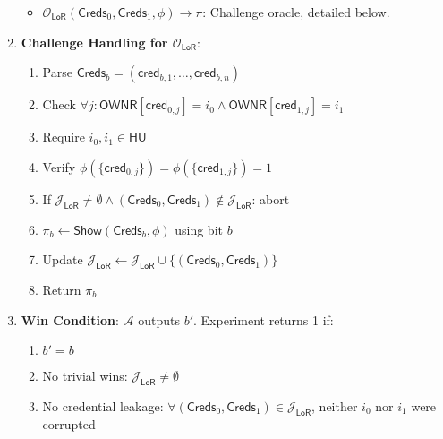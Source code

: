 \begin{enumerate}
\begin{itemize}
        \item $\mathcal{O}_{\mathsf{LoR}}(\mathsf{Creds}_0, \mathsf{Creds}_1, \phi) \rightarrow \pi$: Challenge oracle, detailed below.
    \end{itemize}
    \item \textbf{Challenge Handling for $\mathcal{O}_{\mathsf{LoR}}$}:
    \begin{enumerate}
        \item Parse $\mathsf{Creds}_b = (\mathsf{cred}_{b,1},\ldots,\mathsf{cred}_{b,n})$ 
        \item Check $\forall j: \mathsf{OWNR}[\mathsf{cred}_{0,j}] = i_0 \land \mathsf{OWNR}[\mathsf{cred}_{1,j}] = i_1$ 
        \item Require $i_0,i_1 \in \mathsf{HU}$
        \item Verify $\phi(\{\mathsf{cred}_{0,j}\}) = \phi(\{\mathsf{cred}_{1,j}\}) = 1$ 
        \item If $\mathcal{J}_{\mathsf{LoR}} \neq \emptyset \land (\mathsf{Creds}_0, \mathsf{Creds}_1) \notin \mathcal{J}_{\mathsf{LoR}}$: abort 
        \item $\pi_b \gets \mathsf{Show}(\mathsf{Creds}_b, \phi)$ using bit $b$
        \item Update $\mathcal{J}_{\mathsf{LoR}} \gets \mathcal{J}_{\mathsf{LoR}} \cup \{(\mathsf{Creds}_0,\mathsf{Creds}_1)\}$
        \item Return $\pi_b$
    \end{enumerate}

    \item \textbf{Win Condition}: $\mathcal{A}$ outputs $b'$.
    Experiment returns 1 if:
    \begin{enumerate}
        \item $b' = b$ 
        \item No trivial wins: $\mathcal{J}_{\mathsf{LoR}} \neq \emptyset$ 
        \item No credential leakage: $\forall (\mathsf{Creds}_0,\mathsf{Creds}_1) \in \mathcal{J}_{\mathsf{LoR}}$, neither $i_0$ nor $i_1$ were corrupted
       \end{enumerate}
\end{enumerate}


